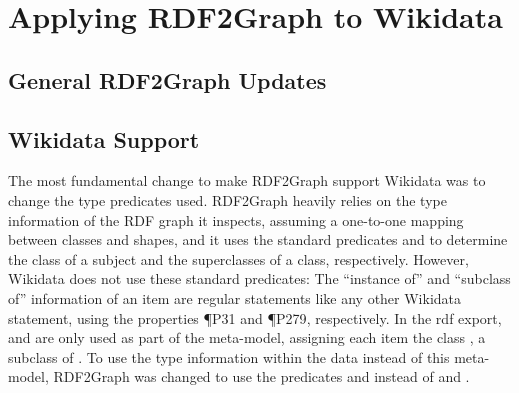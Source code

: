 
\chapter{Applying RDF2Graph to Wikidata}
\label{ch:RDF2Graph+Wikidata}

\section{General RDF2Graph Updates}
\label{sec:RDF2Graph+Wikidata:updates}

\section{Wikidata Support}
\label{sec:RDF2Graph+Wikidata:Wikidata}

The most fundamental change to make RDF2Graph support Wikidata
was %
to change the type predicates used.
RDF2Graph heavily relies on the type information of the RDF graph it inspects,
assuming a one-to-one mapping between classes and shapes,
and it uses the standard predicates  and 
to determine the class of a subject and the superclasses of a class, respectively.
However, Wikidata does not use these standard predicates:
The “instance of” and “subclass of” information of an item
are regular statements like any other Wikidata statement, %
using the properties \P{P31} and \P{P279}, respectively.
In the \gls{rdf} export,  and  are only used
as part of the meta-model, %
assigning each item the class , a subclass of .
To use the type information within the data instead of this meta-model,
RDF2Graph was changed to use the predicates  and  %
instead of  and .

